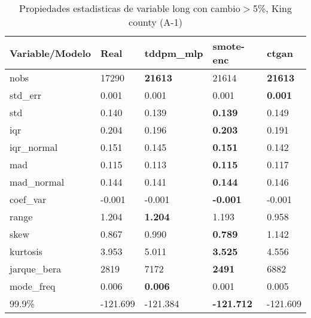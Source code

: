\begin{table}[H]
\centering
\fontsize{8}{14}\selectfont
\caption{Propiedades estadisticas de variable long con cambio\ensuremath{>}5\%, King county (A-1)}
\label{table-stats-king county-a-1-long-short}
\begin{tabular}{|l|m{10em}|m{10em}|m{10em}|m{10em}|}
\hline
 \rowcolor[gray]{0.8}
Variable/Modelo & Real & tddpm\_mlp & smote-enc & ctgan \\
\hline nobs & 17290 & \bfseries 21613 & \cellcolor[rgb]{0.9, 0.54, 0.52} 21614 & \bfseries 21613 \\
\hline std\_err & 0.001 & \cellcolor[rgb]{0.9, 0.54, 0.52} 0.001 & 0.001 & \bfseries 0.001 \\
\hline std & 0.140 & 0.139 & \bfseries 0.139 & \cellcolor[rgb]{0.9, 0.54, 0.52} 0.149 \\
\hline iqr & 0.204 & 0.196 & \bfseries 0.203 & \cellcolor[rgb]{0.9, 0.54, 0.52} 0.191 \\
\hline iqr\_normal & 0.151 & 0.145 & \bfseries 0.151 & \cellcolor[rgb]{0.9, 0.54, 0.52} 0.142 \\
\hline mad & 0.115 & \cellcolor[rgb]{0.9, 0.54, 0.52} 0.113 & \bfseries 0.115 & 0.117 \\
\hline mad\_normal & 0.144 & \cellcolor[rgb]{0.9, 0.54, 0.52} 0.141 & \bfseries 0.144 & 0.146 \\
\hline coef\_var & -0.001 & -0.001 & \bfseries -0.001 & \cellcolor[rgb]{0.9, 0.54, 0.52} -0.001 \\
\hline range & 1.204 & \bfseries 1.204 & 1.193 & \cellcolor[rgb]{0.9, 0.54, 0.52} 0.958 \\
\hline skew & 0.867 & 0.990 & \bfseries 0.789 & \cellcolor[rgb]{0.9, 0.54, 0.52} 1.142 \\
\hline kurtosis & 3.953 & \cellcolor[rgb]{0.9, 0.54, 0.52} 5.011 & \bfseries 3.525 & 4.556 \\
\hline jarque\_bera & 2819 & \cellcolor[rgb]{0.9, 0.54, 0.52} 7172 & \bfseries 2491 & 6882 \\
\hline mode\_freq & 0.006 & \bfseries 0.006 & \cellcolor[rgb]{0.9, 0.54, 0.52} 0.001 & 0.005 \\
\hline 99.9\% & -121.699 & \cellcolor[rgb]{0.9, 0.54, 0.52} -121.384 & \bfseries -121.712 & -121.609 \\
\hline
\end{tabular}
\end{table}

